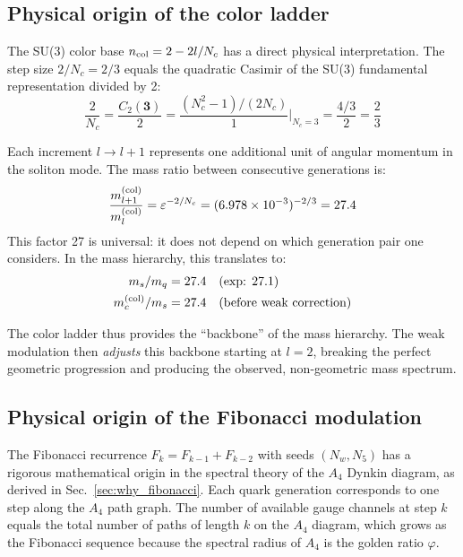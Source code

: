 ﻿\documentclass[twocolumn,preprintnumbers,amsmath,amssymb,prd]{revtex4-2}
\begin{document}
\subsection{Physical origin of the color ladder}

The SU(3) color base $n_{\rm col} = 2 - 2l/N_c$ has a direct physical interpretation. The step size $2/N_c = 2/3$ equals the quadratic Casimir of the SU(3) fundamental representation divided by 2:
\begin{equation}
\frac{2}{N_c} = \frac{C_2(\mathbf{3})}{2} = \frac{(N_c^2-1)/(2N_c)}{1} \bigg|_{N_c=3} = \frac{4/3}{2} = \frac{2}{3}
\end{equation}

Each increment $l \to l+1$ represents one additional unit of angular momentum in the soliton mode. The mass ratio between consecutive generations is:
\begin{equation}
\frac{m_{l+1}^{(\rm col)}}{m_l^{(\rm col)}} = \varepsilon^{-2/N_c} = (6.978 \times 10^{-3})^{-2/3} = 27.4
\end{equation}
This factor 27 is universal: it does not depend on which generation pair one considers. In the mass hierarchy, this translates to:
\begin{align}
m_s / m_q &= 27.4 \quad (\text{exp: } 27.1) \\
m_c^{(\rm col)} / m_s &= 27.4 \quad (\text{before weak correction})
\end{align}

The color ladder thus provides the ``backbone'' of the mass hierarchy. The weak modulation then \emph{adjusts} this backbone starting at $l=2$, breaking the perfect geometric progression and producing the observed, non-geometric mass spectrum.

\subsection{Physical origin of the Fibonacci modulation}

The Fibonacci recurrence $F_k = F_{k-1} + F_{k-2}$ with seeds $(N_w, N_5)$ has a rigorous mathematical origin in the spectral theory of the $A_4$ Dynkin diagram, as derived in Sec.~\ref{sec:why_fibonacci}. Each quark generation corresponds to one step along the $A_4$ path graph. The number of available gauge channels at step $k$ equals the total number of paths of length $k$ on the $A_4$ diagram, which grows as the Fibonacci sequence because the spectral radius of $A_4$ is the golden ratio $\varphi$.
\end{document}
